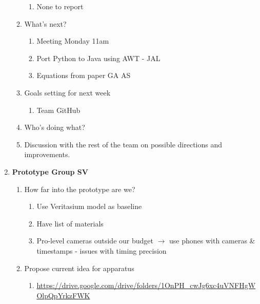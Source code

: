 \begin{enumerate}
\begin{enumerate}
\begin{enumerate}
\item  None to report
\end{enumerate}

\item  What's next? 

\begin{enumerate}
\item  Meeting Monday 11am

\item  Port Python to Java using AWT - JAL

\item  Equations from paper GA AS
\end{enumerate}

\item  Goals setting for next week

\begin{enumerate}
\item  Team GitHub
\end{enumerate}

\item  Who's doing what? 

\item  Discussion with the rest of the team on possible directions and improvements. \\
\end{enumerate}

\item  \textbf{Prototype Group SV}

\begin{enumerate}
\item How far into the prototype are we? 

\begin{enumerate}
\item  Use Veritasium model as baseline

\item  Have list of materials

\item  Pro-level cameras outside our budget $\mathrm{\to}$ use phones with cameras \& timestamps - issues with timing precision
\end{enumerate}

\item  Propose current idea for apparatus

\begin{enumerate}
\item \url{ https://drive.google.com/drive/folders/1OnPH\_cwJg6xc4uVNFHgWOlpQpYrkzFWK}


\end{enumerate}
\end{enumerate}
\end{enumerate}

